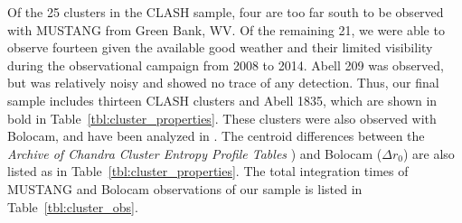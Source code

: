 \documentclass[iop,numberedappendix,apj]{emulateapj}
\begin{document}
Of the 25 clusters in the CLASH sample, four are too far south to be observed with MUSTANG from Green Bank, WV.
Of the remaining 21, we were able to observe fourteen given the available good weather and their limited visibility
during the observational campaign from 2008 to 2014.
Abell 209 was observed, but was relatively noisy and showed no trace of any detection. Thus, our final sample
includes thirteen CLASH clusters and Abell 1835, which are shown in bold in Table~\ref{tbl:cluster_properties}. These clusters
were also observed with Bolocam, and have been analyzed in \citet{sayers2012, sayers2013,czakon2014}. The centroid differences
between the \emph{Archive of Chandra Cluster Entropy Profile Tables} \citep[ACCEPT][]{cavagnolo2009}) 
and Bolocam ($\Delta r_0$) are also listed as  in Table~\ref{tbl:cluster_properties}. The total integration times of
MUSTANG and Bolocam observations of our sample is listed in Table~\ref{tbl:cluster_obs}. 
\end{document}
